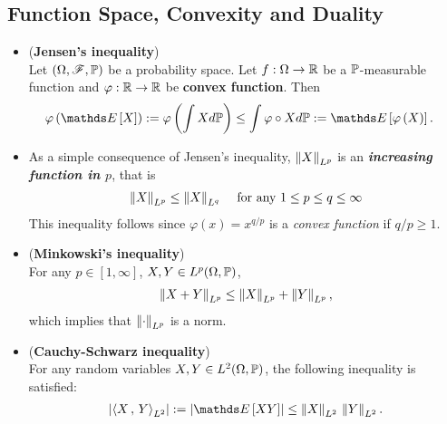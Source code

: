 \documentclass[11pt]{article}
\begin{document}
\subsection{Function Space, Convexity and Duality}
\begin{itemize}
\item \begin{proposition} (\textbf{Jensen's inequality}) \citep{vershynin2018high}\\
Let $(\Omega, {\mathscr F}, {\mathbb P})$ be a probability space. Let $f:\Omega \to {\mathbb R}$ be a ${\mathbb P}$-measurable function and  $\varphi: {\mathbb R} \to {\mathbb R}$ be \textbf{convex function}. Then
\begin{align}
\varphi\paren{\E{}{X}} := \varphi\paren{\int X d\bP} &\le \int \varphi \circ X d\bP := \E{}{\varphi\paren{X}}. \label{ineqn: jensen}
\end{align}
\end{proposition}

\item \begin{remark}
As a simple consequence of Jensen's inequality, $\left\|X\right\|_{L^p}$ is an \emph{\textbf{increasing function in $p$}}, that is
\begin{align}
\left\|X\right\|_{L^p} \le \left\|X\right\|_{L^q}\,\quad \text{for any } 1 \le p \le q \le \infty  \label{ineqn: lp_norm}
\end{align}
This inequality follows since $\varphi(x) = x^{q/p}$ is a \emph{convex function} if $q/p \ge 1$.
\end{remark}

\item \begin{proposition} (\textbf{Minkowski's inequality}) \citep{vershynin2018high}\\
For any $p\in [1, \infty]$, $X, Y \in L^p(\Omega, {\mathbb P})$, 
\begin{align}
\left\|X+ Y\right\|_{L^p} \le \left\|X\right\|_{L^p} + \left\|Y\right\|_{L^p},  \label{ineqn: norm_triangle_inequality}
\end{align} which implies that $\left\|\cdot\right\|_{L^p}$ is a norm.
\end{proposition}

\item \begin{proposition} (\textbf{Cauchy-Schwarz inequality}) \citep{vershynin2018high}\\
For any random variables $X, Y \in L^2(\Omega, {\mathbb P})$, the following inequality is satisfied:
\begin{align}
\abs{\inn{X}{Y}_{L^2}} := \abs{\E{}{XY}} \le \norm{X}{L^2} \, \norm{Y}{L^2}. \label{ineqn: cauchy_schwarz_inequality}
\end{align}
\end{proposition}


\end{itemize}
\end{document}
